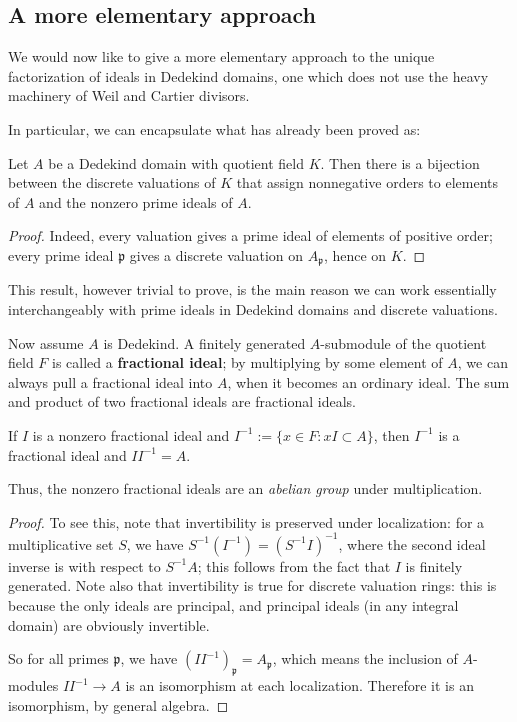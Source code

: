\subsection{A more elementary approach}

We would now like to give  a more elementary approach to the unique
factorization of ideals in Dedekind domains, one which does not use the heavy
machinery of Weil and Cartier divisors.

In particular, we can encapsulate what has already been proved as:
\begin{theorem} Let $A$ be a Dedekind domain with quotient field $K$. Then there is a bijection between the discrete valuations of $K$ that assign nonnegative orders to elements of $A$ and the nonzero prime ideals of $A$.
\end{theorem}
\begin{proof} Indeed, every valuation gives a prime ideal of elements of positive order; every prime ideal $\mathfrak{p}$ gives a discrete valuation on $A_{\mathfrak{p}}$, hence on $K$. \end{proof}


This result, however trivial to prove, is the main reason we can work essentially interchangeably with prime ideals in Dedekind domains and discrete valuations.

Now assume  $A$ is Dedekind. A finitely generated $A$-submodule of the quotient field $F$ is called a \textbf{fractional ideal}; by multiplying by some element of $A$, we can always pull a fractional ideal into $A$, when it becomes an ordinary ideal.  The sum and product of two fractional ideals are fractional ideals.

\begin{theorem}[Invertibility]  If $I$ is a nonzero fractional ideal and $ I^{-1} := \{ x \in F: xI \subset A \}$, then $I^{-1}$ is a fractional ideal and $I I^{-1} = A$.
\end{theorem}

Thus, the nonzero fractional ideals are an \emph{abelian group} under multiplication.

\begin{proof}
To see this, note that invertibility is preserved under localization: for a multiplicative set $S$, we have $S^{-1} ( I^{-1} ) = (S^{-1} I)^{-1}$, where the second ideal inverse is with respect to $S^{-1}A$; this follows from the fact that $I$ is finitely generated.  Note also that invertibility is true for discrete valuation rings: this is because the only ideals are principal, and principal ideals (in any integral domain) are obviously invertible.

So for all primes $\mathfrak{p}$, we have $(I I^{-1})_{\mathfrak{p}} = A_{\mathfrak{p}}$, which means the inclusion of $A$-modules $I I^{-1} \to A$ is an isomorphism at each localization.  Therefore it is an isomorphism, by general algebra.
\end{proof} 


